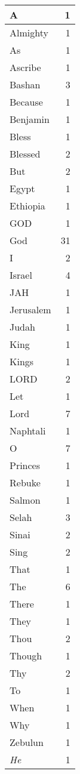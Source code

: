 \begin{center}
\begin{longtable}{l|r}
\hline \hline
\endlastfoot
A & 1 \\ \hline
Almighty & 1 \\ \hline
As & 1 \\ \hline
Ascribe & 1 \\ \hline
Bashan & 3 \\ \hline
Because & 1 \\ \hline
Benjamin & 1 \\ \hline
Bless & 1 \\ \hline
Blessed & 2 \\ \hline
But & 2 \\ \hline
Egypt & 1 \\ \hline
Ethiopia & 1 \\ \hline
GOD & 1 \\ \hline
God & 31 \\ \hline
I & 2 \\ \hline
Israel & 4 \\ \hline
JAH & 1 \\ \hline
Jerusalem & 1 \\ \hline
Judah & 1 \\ \hline
King & 1 \\ \hline
Kings & 1 \\ \hline
LORD & 2 \\ \hline
Let & 1 \\ \hline
Lord & 7 \\ \hline
Naphtali & 1 \\ \hline
O & 7 \\ \hline
Princes & 1 \\ \hline
Rebuke & 1 \\ \hline
Salmon & 1 \\ \hline
Selah & 3 \\ \hline
Sinai & 2 \\ \hline
Sing & 2 \\ \hline
That & 1 \\ \hline
The & 6 \\ \hline
There & 1 \\ \hline
They & 1 \\ \hline
Thou & 2 \\ \hline
Though & 1 \\ \hline
Thy & 2 \\ \hline
To & 1 \\ \hline
When & 1 \\ \hline
Why & 1 \\ \hline
Zebulun & 1 \\ \hline
\emph{He} & 1 \\ \hline

\end{longtable}
\end{center}
